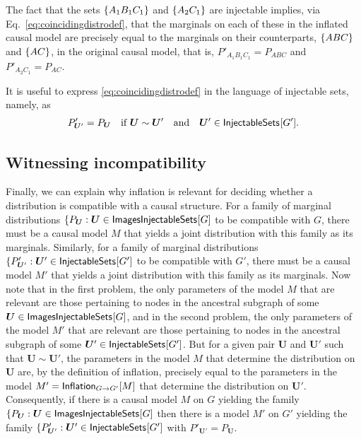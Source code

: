 The fact that the sets $\brackets{A_1 B_1 C_1}$ and $\brackets{A_2 C_1}$ are injectable implies, via Eq.~\eqref{eq:coincidingdistrodef}, that the marginals on each of these in the inflated causal model are precisely equal to the marginals on their counterparts, $\brackets{A B C}$ and $\brackets{A C}$, in the original causal model, that is, $P'_{A_1 B_1 C_1} = P_{A B C}$ and $P'_{A_2 C_1} = P_{A C}$.

It is useful to express \cref{eq:coincidingdistrodef} in the language of injectable sets, namely, as 
\begin{align}\label{keyinference}
P'_{\bm{U}'}=P_{\bm{U}}\quad\text{if }  \bm{U} \sim \bm{U}'\quad \text{and} \quad \bm{U}'\in\SmallNamedFunction{InjectableSets}{G'}.%
\end{align}

\subsection{Witnessing incompatibility\label{subsec:witnessingincompat}}

Finally, we can explain why inflation is relevant for deciding whether a distribution is compatible with a causal structure.  For a family of marginal distributions $\{ P_{\bm{U}} : \bm{U} \in \SmallNamedFunction{ImagesInjectableSets}{G}$ to be compatible with $G$, there must be a causal model $M$ that yields a joint distribution with this family as its marginals.   Similarly, for a family of marginal distributions $\{ P'_{\bm{U}'} : \bm{U}' \in \SmallNamedFunction{InjectableSets}{G'}$ to be compatible with $G'$, there must be a causal model $M'$ that yields a joint distribution with this family as its marginals.  Now note that in the first problem, the only parameters of the model $M$ that are relevant are those pertaining to nodes in the ancestral subgraph of some $\bm{U}\in \SmallNamedFunction{ImagesInjectableSets}{G}$, and in the second problem, the only parameters of the model $M'$ that are relevant are those pertaining to nodes in the ancestral subgraph of some $\bm{U}' \in \SmallNamedFunction{InjectableSets}{G'}$.  But for a given pair $\bm{U}$ and $\bm{U}'$ such that  $\bm{U} \sim \bm{U}'$, the parameters in the model $M$ that determine the distribution on  $\bm{U}$ are, by the definition of inflation, precisely equal to the parameters in the model $M' = \SmallNamedFunction[G\to G']{Inflation}{M}$ that determine the distribution on $\bm{U}'$.  
Consequently, if there is a causal model $M$ on $G$ yielding the family $\{ P_{\bm{U}} : \bm{U} \in \SmallNamedFunction{ImagesInjectableSets}{G}$ then there is a model $M'$ on $G'$ yielding the family $\{ P'_{\bm{U}'} : \bm{U}' \in \SmallNamedFunction{InjectableSets}{G'}$ with $P'_{\bm{U}'}= P_{\bm{U}}$.  

